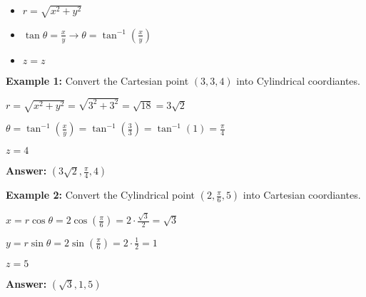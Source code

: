 \documentclass[10pt]{article}                               %
\begin{document}
\begin{defaultbox}
\begin{adjustwidth}{2em}{0pt}
\begin{adjustwidth}{2em}{0pt}
            \begin{itemize}
                \item \( r = \sqrt{x^2 + y^2} \)
                \item \( \tan\theta = \frac{x}{y}  \rightarrow  \theta = \tan^{-1}\left(\frac{x}{y}\right) \)
                \item \( z = z \)
            \end{itemize}

            \begin{examplebox}
            
                \textbf{Example 1:} Convert the Cartesian point \( \left(3,3,4\right) \) into Cylindrical coordiantes.
                \vspace{0.5em}

                \begin{adjustwidth}{2em}{0pt}

                    \( r = \sqrt{x^2 + y^2} = \sqrt{3^2 + 3^2} = \sqrt{18} = 3\sqrt{2} \)

                    \( \theta = \tan^{-1}\left(\frac{x}{y}\right) = \tan^{-1}\left(\frac{3}{3}\right) = \tan^{-1}(1) = \frac{\pi}{4} \)

                    \( z = 4 \)

                    \textbf{Answer:} \( \left(3\sqrt{2}, \frac{\pi}{4}, 4\right) \)

                \end{adjustwidth}

                \vspace{1em}

                \textbf{Example 2:} Convert the Cylindrical point \( \left(2, \frac{\pi}{6}, 5\right) \) into Cartesian coordiantes.
                \vspace{0.5em}

                \begin{adjustwidth}{2em}{0pt}

                    \( x = r\cos\theta = 2\cos\left(\frac{\pi}{6}\right) = 2 \cdot \frac{\sqrt{3}}{2} = \sqrt{3} \)

                    \( y = r\sin\theta = 2\sin\left(\frac{\pi}{6}\right) = 2 \cdot \frac{1}{2} = 1 \)

                    \( z = 5 \)

                    \textbf{Answer:} \( \left(\sqrt{3}, 1, 5\right) \)

                \end{adjustwidth}


\end{examplebox}
\end{adjustwidth}
\end{adjustwidth}
\end{defaultbox}
\end{document}

